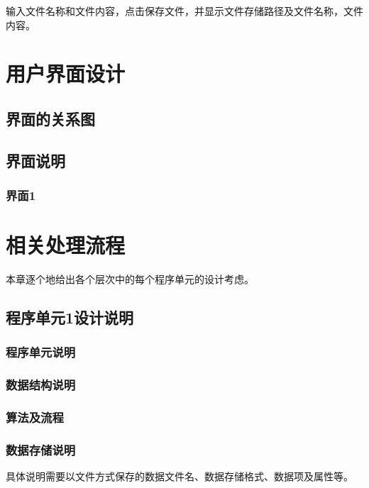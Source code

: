 \documentclass[UTF8,a4paper,12pt]{ctexart}
\newcommand{\blankline}{\par\vspace{1.2em}}
\begin{document}
输入文件名称和文件内容，点击保存文件，并显示文件存储路径及文件名称，文件内容。

\section{用户界面设计}

\subsection{界面的关系图}
\blankline

\subsection{界面说明}

\subsubsection{界面1}
\blankline

\section{相关处理流程}

本章逐个地给出各个层次中的每个程序单元的设计考虑。

\subsection{程序单元1设计说明}

\subsubsection{程序单元说明}
\blankline

\subsubsection{数据结构说明}
\blankline

\subsubsection{算法及流程}
\blankline

\subsubsection{数据存储说明}

具体说明需要以文件方式保存的数据文件名、数据存储格式、数据项及属性等。
\end{document}
